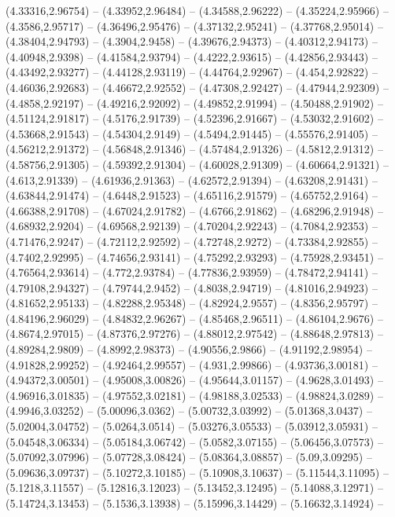 {(4.33316,2.96754) -- (4.33952,2.96484) -- (4.34588,2.96222) -- (4.35224,2.95966) -- (4.3586,2.95717) -- (4.36496,2.95476) -- (4.37132,2.95241) -- (4.37768,2.95014) -- (4.38404,2.94793) -- (4.3904,2.9458) -- (4.39676,2.94373) -- (4.40312,2.94173) --
(4.40948,2.9398) -- (4.41584,2.93794) -- (4.4222,2.93615) -- (4.42856,2.93443) -- (4.43492,2.93277) -- (4.44128,2.93119) -- (4.44764,2.92967) -- (4.454,2.92822) -- (4.46036,2.92683) -- (4.46672,2.92552) -- (4.47308,2.92427) -- (4.47944,2.92309) --
(4.4858,2.92197) -- (4.49216,2.92092) -- (4.49852,2.91994) -- (4.50488,2.91902) -- (4.51124,2.91817) -- (4.5176,2.91739) -- (4.52396,2.91667) -- (4.53032,2.91602) -- (4.53668,2.91543) -- (4.54304,2.9149) -- (4.5494,2.91445) -- (4.55576,2.91405) --
(4.56212,2.91372) -- (4.56848,2.91346) -- (4.57484,2.91326) -- (4.5812,2.91312) -- (4.58756,2.91305) -- (4.59392,2.91304) -- (4.60028,2.91309) -- (4.60664,2.91321) -- (4.613,2.91339) -- (4.61936,2.91363) -- (4.62572,2.91394) -- (4.63208,2.91431) --
(4.63844,2.91474) -- (4.6448,2.91523) -- (4.65116,2.91579) -- (4.65752,2.9164) -- (4.66388,2.91708) -- (4.67024,2.91782) -- (4.6766,2.91862) -- (4.68296,2.91948) -- (4.68932,2.9204) -- (4.69568,2.92139) -- (4.70204,2.92243) -- (4.7084,2.92353) --
(4.71476,2.9247) -- (4.72112,2.92592) -- (4.72748,2.9272) -- (4.73384,2.92855) -- (4.7402,2.92995) -- (4.74656,2.93141) -- (4.75292,2.93293) -- (4.75928,2.93451) -- (4.76564,2.93614) -- (4.772,2.93784) -- (4.77836,2.93959) -- (4.78472,2.94141) --
(4.79108,2.94327) -- (4.79744,2.9452) -- (4.8038,2.94719) -- (4.81016,2.94923) -- (4.81652,2.95133) -- (4.82288,2.95348) -- (4.82924,2.9557) -- (4.8356,2.95797) -- (4.84196,2.96029) -- (4.84832,2.96267) -- (4.85468,2.96511) -- (4.86104,2.9676) --
(4.8674,2.97015) -- (4.87376,2.97276) -- (4.88012,2.97542) -- (4.88648,2.97813) -- (4.89284,2.9809) -- (4.8992,2.98373) -- (4.90556,2.9866) -- (4.91192,2.98954) -- (4.91828,2.99252) -- (4.92464,2.99557) -- (4.931,2.99866) -- (4.93736,3.00181) --
(4.94372,3.00501) -- (4.95008,3.00826) -- (4.95644,3.01157) -- (4.9628,3.01493) -- (4.96916,3.01835) -- (4.97552,3.02181) -- (4.98188,3.02533) -- (4.98824,3.0289) -- (4.9946,3.03252) -- (5.00096,3.0362) -- (5.00732,3.03992) -- (5.01368,3.0437) --
(5.02004,3.04752) -- (5.0264,3.0514) -- (5.03276,3.05533) -- (5.03912,3.05931) -- (5.04548,3.06334) -- (5.05184,3.06742) -- (5.0582,3.07155) -- (5.06456,3.07573) -- (5.07092,3.07996) -- (5.07728,3.08424) -- (5.08364,3.08857) -- (5.09,3.09295) --
(5.09636,3.09737) -- (5.10272,3.10185) -- (5.10908,3.10637) -- (5.11544,3.11095) -- (5.1218,3.11557) -- (5.12816,3.12023) -- (5.13452,3.12495) -- (5.14088,3.12971) -- (5.14724,3.13453) -- (5.1536,3.13938) -- (5.15996,3.14429) -- (5.16632,3.14924) --
}
